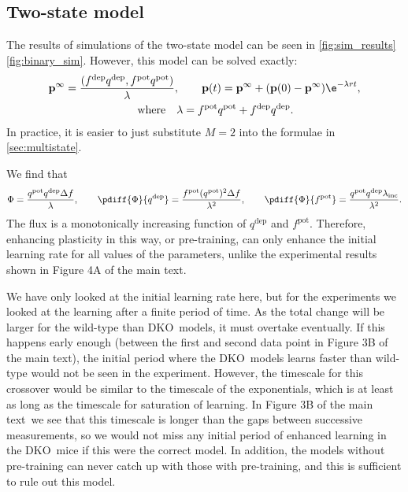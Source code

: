 \documentclass[10pt]{article}
\newcommand{\pr}{\mathbf{p}}
\newcommand{\eq}{\pr^\infty}
\newcommand{\pot}{^{\text{pot}}}
\newcommand{\dep}{^{\text{dep}}}
\newcommand{\inc}{_{\text{inc}}}
\newcommand{\KO}{DKO}
\newcommand{\modelfig}[1][A]{Figure 4#1 of the main text}
\newcommand{\datafig}[1][B]{Figure 3#1 of the main text}
\begin{document}



\subsection{Two-state model}\label{sec:binary}




The results of simulations of the two-state model can be seen in
\autoref{fig:sim_results}\ref{fig:binary_sim}.
However, this model can be solved exactly:
%
\begin{multline}\label{eq:binarysol}
  \eq = \frac{(f\dep q\dep, f\pot q\pot)}{\lambda},
  \qquad
  \pr(t) = \eq + (\pr(0)-\eq)\e^{-\lambda rt},\\
  \qquad \text{where} \quad
  \lambda = f\pot q\pot + f\dep q\dep.
\end{multline}
%
In practice, it is easier to just substitute $M=2$ into the formulae in \autoref{sec:multistate}.

We find that
%
\begin{equation}\label{eq:binaryflux}
  \Phi = \frac{q\pot q\dep \Delta f}{\lambda}, \qquad
  \pdiff{\Phi}{q\dep} = \frac{f\pot (q\pot)^2 \Delta f}{\lambda^2}, \qquad
  \pdiff{\Phi}{f\pot} = \frac{q\pot q\dep \lambda\inc}{\lambda^2}.
\end{equation}
%
The flux is a monotonically increasing function of $q\dep$ and $f\pot$.
Therefore, enhancing plasticity in this way, or pre-training, can only enhance the initial learning rate for all values of the parameters, unlike the experimental results shown in \modelfig.



We have only looked at the initial learning rate here, but for the experiments we looked at the learning after a finite period of time.
As the total change will be larger for the wild-type than \KO\ models, it must overtake eventually.
If this happens early enough (\ie between the first and second data point in \datafig), the initial period where the \KO\ models learns faster than wild-type would not be seen in the experiment.
However, the timescale for this crossover would be similar to the timescale of the exponentials, which is at least as long as the timescale for saturation of learning.
In \datafig\ we see that this timescale is longer than the gaps between successive measurements, so we would not miss any initial period of enhanced learning in the \KO\ mice if this were the correct model.
In addition, the models without pre-training can never catch up with those with pre-training, and this is sufficient to rule out this model.
\end{document}

